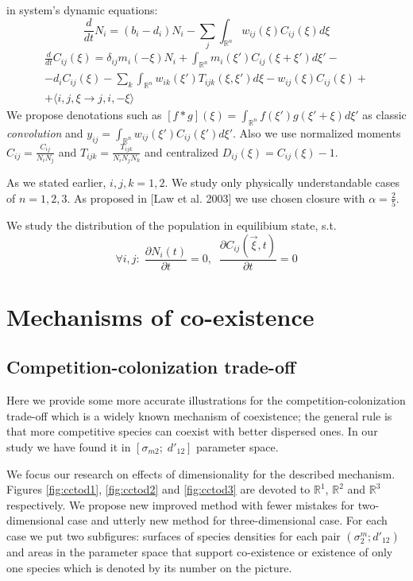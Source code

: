 \documentclass[%
 aip,
rsi,%
 amsmath,amssymb,
 reprint,%
]{revtex4-1}
\begin{document}
in system's dynamic equations:
\[
\frac{d}{dt}N_{i}=(b_{i}-d_{i})N_{i}-\sum_{j}\int_{\mathbb{R}^{n}}w_{ij}(\xi)C_{ij}(\xi)d\xi
\]
\begin{multline*}
\frac{d}{dt}C_{ij}(\xi)= \delta_{ij}m_{i}(-\xi)N_{i}+\int_{\mathbb{\mathbb{R}}^{n}}m_{i}(\xi')C_{ij}(\xi+\xi')d\xi'-\\-d_{i}C_{ij}(\xi)-\sum_{k}\int_{\mathbb{\mathbb{R}}^{n}}w_{ik}(\xi')T_{ijk}(\xi,\xi')d\xi-w_{ij}(\xi)C_{ij}(\xi)+\\+\langle i,j,\xi\to j,i,-\xi\rangle
\end{multline*}
We propose denotations such as $[f*g](\xi)=\int_{\mathbb{\mathbb{R}}^{n}}f(\xi')g(\xi'+\xi)d\xi'$
as classic \emph{convolution }and $y_{ij}=\int_{\mathbb{\mathbb{R}}^{n}}w_{ij}(\xi')C_{ij}(\xi')d\xi'$.
Also we use normalized moments $C_{ij}=\frac{C_{ij}}{N_{i}N_{j}}$
and $T_{ijk}=\frac{T_{ijk}}{N_{i}N_{j}N_{k}}$ and centralized $D_{ij}(\xi)=C_{ij}(\xi)-1$.
\par
As we stated earlier, \( i, j, k=1,2\). We study only physically understandable cases of \( n= 1, 2, 3 \). As proposed in [Law et al. 2003] we use chosen closure with 
\(
    \alpha=\frac 2 5
    \).

We study the distribution of the population in equilibium state, s.t.
\[
    \forall i,j: \; \frac{\partial N_i(t)}{\partial t}=0, \;\; \frac{\partial C_{ij}(\vec{\xi}, t)}{\partial t}=0
\]
    
\section{Mechanisms of co-existence}

\subsection{Competition-colonization trade-off}

Here we provide some more accurate illustrations for the competition-colonization trade-off which is a widely known mechanism of coexistence; the general rule is that more competitive species can coexist with better dispersed ones. In our study we have found it in $\left[\sigma_{m2};\;d'_{12}\right]$ parameter space.

We focus our research on effects of dimensionality for the described mechanism. Figures \ref{fig:cctod1}, \ref{fig:cctod2} and \ref{fig:cctod3} are devoted to $\mathbb{R}^1$, $\mathbb{R}^2$ and $\mathbb{R}^3$ respectively. We propose new improved method with fewer mistakes for two-dimensional
case and utterly new method for three-dimensional case. For each case we put two subfigures: surfaces of species densities for each pair \( (\sigma^m_2; d'_{12}) \) and areas in the parameter space that support co-existence or existence of only one species which is denoted by its number on the picture.
\end{document}
